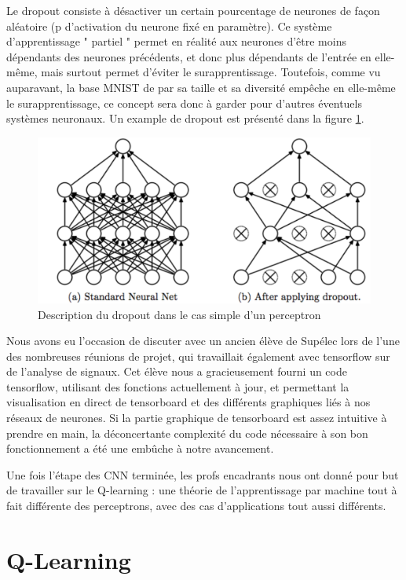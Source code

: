 \documentclass[
    10pt,
    a4paper,
    oneside,
    headinclude,footinclude,
    BCOR=5mm,
    captions=tableabove
]{scrartcl}
\begin{document}
Le dropout consiste à désactiver un certain pourcentage de neurones de façon aléatoire (p d'activation du neurone fixé en paramètre). Ce système d'apprentissage " partiel " permet en réalité aux neurones d'être moins dépendants des neurones précédents, et donc plus dépendants de l'entrée en elle-même, mais surtout permet d'éviter le surapprentissage. Toutefois, comme vu auparavant, la base MNIST de par sa taille et sa diversité empêche en elle-même le surapprentissage, ce concept sera donc à garder pour d'autres éventuels systèmes neuronaux.
Un example de dropout est présenté dans la figure \ref{fig:dropout.PNG}.

\begin{figure}[h!]
\includegraphics[width=\linewidth]{dropout.PNG}
\centering
\caption{Description du dropout dans le cas simple d'un perceptron}
\label{fig:dropout.PNG}
\end{figure}

Nous avons eu l'occasion de discuter avec un ancien élève de Supélec lors de l'une des nombreuses réunions de projet, qui travaillait également avec tensorflow sur de l'analyse de signaux. Cet élève nous a gracieusement fourni un code tensorflow, utilisant des fonctions actuellement à jour, et permettant la visualisation en direct de tensorboard et des différents graphiques liés à nos réseaux de neurones. Si la partie graphique de tensorboard est assez intuitive à prendre en main, la déconcertante complexité du code nécessaire à son bon fonctionnement a été une embûche à notre avancement.

Une fois l'étape des CNN terminée, les profs encadrants nous ont donné pour but de travailler sur le Q-learning : une théorie de l'apprentissage par machine tout à fait différente des perceptrons, avec des cas d'applications tout aussi différents.

\newpage
\section{Q-Learning}
\end{document}
